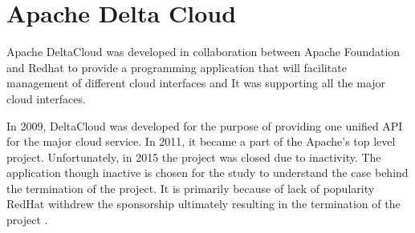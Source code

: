 \section{Apache Delta Cloud}

Apache DeltaCloud was developed in collaboration between Apache Foundation and Redhat
to provide a programming application that will 
facilitate management of different cloud interfaces and
It was supporting all the major cloud interfaces. 

In 2009, DeltaCloud was developed for the purpose of providing one unified 
API for the major cloud service. 
In 2011, it became a part of the Apache’s top level project. Unfortunately,
in 2015 the project was closed due to inactivity. 
The application though inactive is chosen for the study to understand 
the case behind the termination of the project. 
It is primarily because of lack of popularity RedHat withdrew the 
sponsorship ultimately resulting in the 
termination of the project \cite{hid-sp18-417-wiki-deltacloud}.
